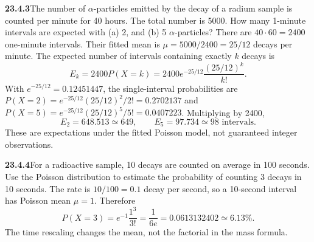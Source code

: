 \par\bigskip
\noindent\textbf{23.4.3}\quad The number of $\alpha$-particles
emitted by the decay of a radium sample is counted per minute
for 40 hours. The total number is 5000. How many 1-minute
intervals are expected with (a) 2, and (b) 5 $\alpha$-particles?
\solution
There are $40\cdot60=2400$ one-minute intervals. Their fitted mean is
$\mu=5000/2400=25/12$ decays per minute. The expected number of
intervals containing exactly $k$ decays is
\[
E_k=2400P(X=k)=2400e^{-25/12}\frac{(25/12)^k}{k!}.
\]
With $e^{-25/12}=0.12451447$, the single-interval probabilities are
$P(X=2)=e^{-25/12}(25/12)^2/2!=0.2702137$ and
$P(X=5)=e^{-25/12}(25/12)^5/5!=0.0407223$. Multiplying by 2400,
\[
\boxed{E_2=648.513\simeq649,\qquad
E_5=97.734\simeq98\text{ intervals}}.
\]
These are expectations under the fitted Poisson model, not guaranteed
integer observations. 


\par\bigskip
\noindent\textbf{23.4.4}\quad For a radioactive sample, 10 decays
are counted on average in 100 seconds. Use the Poisson
distribution to estimate the probability of counting 3 decays in
10 seconds.
\solution
The rate is $10/100=0.1$ decay per second, so a 10-second interval has
Poisson mean $\mu=1$. Therefore
\[
\boxed{P(X=3)=e^{-1}\frac{1^3}{3!}=\frac1{6e}
=0.0613132402\simeq6.13\%}.
\]
The time rescaling changes the mean, not the factorial in the mass formula.


